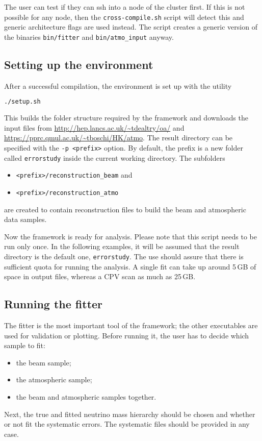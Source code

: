 \documentclass[a4paper, 11pt]{article}
\begin{document}
The user can test if they can ssh into a node of the cluster first.
If this is not possible for any node, then the \texttt{cross-compile.sh} script will detect this and generic architecture flags are used instead.
The script creates a generic version of the binaries \texttt{bin/fitter} and \texttt{bin/atmo\_input} anyway.

\subsection{Setting up the environment}

After a successful compilation, the environment is set up with the utility
\begin{lstlisting}[language=bash]
	./setup.sh
\end{lstlisting}
This builds the folder structure required by the framework and downloads the input files from %
\url{http://hep.lancs.ac.uk/~tdealtry/oa/} and \url{https://pprc.qmul.ac.uk/~tboschi/HK/atmo}.
The result directory can be specified with the \texttt{-p <prefix>} option.
By default, the prefix is a new folder called \texttt{errorstudy} inside the current working directory.
The subfolders
\begin{itemize}
		\small
	\item \texttt{<prefix>/reconstruction\_beam} and
	\item \texttt{<prefix>/reconstruction\_atmo}
\end{itemize}
are created to contain reconstruction files to build the beam and atmospheric data samples.

Now the framework is ready for analysis. Please note that this script needs to be run only once.
In the following examples, it will be assumed that the result directory is the default one, %
\texttt{errorstudy}.
The use should assure that there is sufficient quota for running the analysis.
A single fit can take up around 5\,GB of space in output files, whereas a CPV scan %
as much as 25\,GB.

\subsection{Running the fitter}

The fitter is the most important tool of the framework; %
the other executables are used for validation or plotting.
Before running it, the user has to decide which sample to fit:
\begin{itemize}
	\item the beam sample;
	\item the atmospheric sample;
	\item the beam and atmospheric samples together.
\end{itemize}
Next, the true and fitted neutrino mass hierarchy should be chosen and whether or not %
fit the systematic errors.
The systematic files should be provided in any case.
\end{document}
